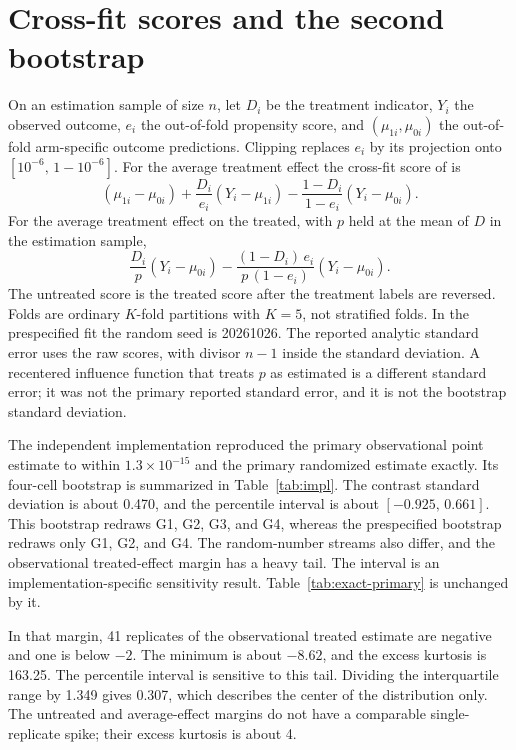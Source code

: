 \documentclass[11pt]{article}
\begin{document}
\section{Cross-fit scores and the second bootstrap}
\label{sec:scores}

On an estimation sample of size $n$, let $D_i$ be the treatment indicator, $Y_i$ the observed outcome, $e_i$ the out-of-fold propensity score, and $(\mu_{1i},\mu_{0i})$ the out-of-fold arm-specific outcome predictions. Clipping replaces $e_i$ by its projection onto $[10^{-6},\,1-10^{-6}]$. For the average treatment effect the cross-fit score of \citet{bang2005} is
\begin{equation}
(\mu_{1i}-\mu_{0i})
+
\frac{D_i}{e_i}(Y_i-\mu_{1i})
-
\frac{1-D_i}{1-e_i}(Y_i-\mu_{0i}).
\label{eq:ate-score}
\end{equation}
For the average treatment effect on the treated, with $p$ held at the mean of $D$ in the estimation sample,
\begin{equation}
\frac{D_i}{p}(Y_i-\mu_{0i})
-
\frac{(1-D_i)\,e_i}{p\,(1-e_i)}(Y_i-\mu_{0i}).
\label{eq:att-score}
\end{equation}
The untreated score is the treated score after the treatment labels are reversed. Folds are ordinary $K$-fold partitions with $K=5$, not stratified folds. In the prespecified fit the random seed is 20261026. The reported analytic standard error uses the raw scores, with divisor $n-1$ inside the standard deviation. A recentered influence function that treats $p$ as estimated is a different standard error; it was not the primary reported standard error, and it is not the bootstrap standard deviation.

The independent implementation reproduced the primary observational point estimate to within $1.3\times 10^{-15}$ and the primary randomized estimate exactly. Its four-cell bootstrap is summarized in Table~\ref{tab:impl}. The contrast standard deviation is about 0.470, and the percentile interval is about $[-0.925,\,0.661]$. This bootstrap redraws G1, G2, G3, and G4, whereas the prespecified bootstrap redraws only G1, G2, and G4. The random-number streams also differ, and the observational treated-effect margin has a heavy tail. The interval is an implementation-specific sensitivity result. Table~\ref{tab:exact-primary} is unchanged by it.

In that margin, 41 replicates of the observational treated estimate are negative and one is below $-2$. The minimum is about $-8.62$, and the excess kurtosis is 163.25. The percentile interval is sensitive to this tail. Dividing the interquartile range by 1.349 gives 0.307, which describes the center of the distribution only. The untreated and average-effect margins do not have a comparable single-replicate spike; their excess kurtosis is about 4.
\end{document}
